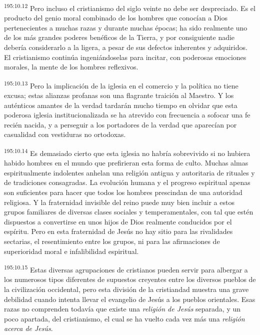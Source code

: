 \par 
\textsuperscript{195:10.12} Pero incluso el cristianismo del siglo veinte no debe ser despreciado. Es el producto del genio moral combinado de los hombres que conocían a Dios pertenecientes a muchas razas y durante muchas épocas; ha sido realmente uno de los más grandes poderes benéficos de la Tierra, y por consiguiente nadie debería considerarlo a la ligera, a pesar de sus defectos inherentes y adquiridos. El cristianismo continúa ingeniándoselas para incitar, con poderosas emociones morales, la mente de los hombres reflexivos.

\par 
\textsuperscript{195:10.13} Pero la implicación de la iglesia en el comercio y la política no tiene excusa; estas alianzas profanas son una flagrante traición al Maestro. Y los auténticos amantes de la verdad tardarán mucho tiempo en olvidar que esta poderosa iglesia institucionalizada se ha atrevido con frecuencia a sofocar una fe recién nacida, y a perseguir a los portadores de la verdad que aparecían por casualidad con vestiduras no ortodoxas.

\par 
\textsuperscript{195:10.14} Es demasiado cierto que esta iglesia no habría sobrevivido si no hubiera habido hombres en el mundo que prefirieran esta forma de culto. Muchas almas espiritualmente indolentes anhelan una religión antigua y autoritaria de rituales y de tradiciones consagradas. La evolución humana y el progreso espiritual apenas son suficientes para hacer que todos los hombres prescindan de una autoridad religiosa. Y la fraternidad invisible del reino puede muy bien incluir a estos grupos familiares de diversas clases sociales y temperamentales, con tal que estén dispuestos a convertirse en unos hijos de Dios realmente conducidos por el espíritu. Pero en esta fraternidad de Jesús no hay sitio para las rivalidades sectarias, el resentimiento entre los grupos, ni para las afirmaciones de superioridad moral e infalibilidad espiritual.

\par 
\textsuperscript{195:10.15} Estas diversas agrupaciones de cristianos pueden servir para albergar a los numerosos tipos diferentes de supuestos creyentes entre los diversos pueblos de la civilización occidental, pero esta división de la cristiandad muestra una grave debilidad cuando intenta llevar el evangelio de Jesús a los pueblos orientales. Esas razas no comprenden todavía que existe una \textit{religión de Jesús} separada, y un poco apartada, del cristianismo, el cual se ha vuelto cada vez más una \textit{religión acerca de Jesús}.

